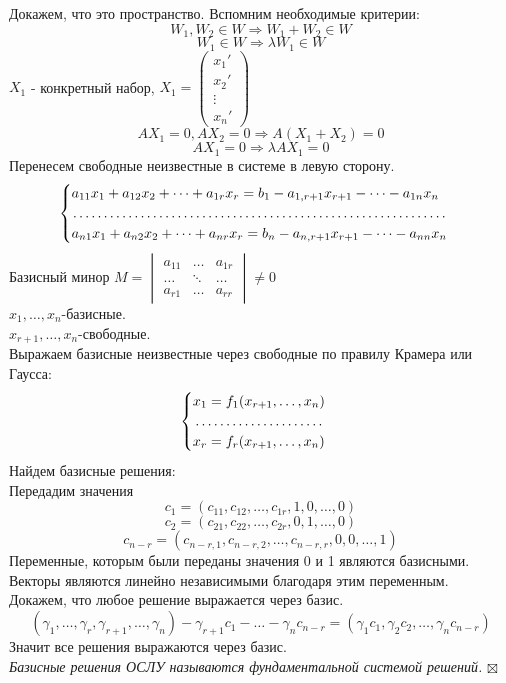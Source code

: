 \documentclass[a4paper, 12pt]{report}
\newenvironment{Proof}
{\par\noindent{$\blacklozenge$}}
{\hfill$\scriptstyle\boxtimes$}
\begin{document}
\begin{Proof}
   Докажем, что это пространство. Вспомним необходимые критерии:
   $$W_1, W_2  \in W \Rightarrow W_1+W_2 \in W$$
   $$W_1 \in W \Rightarrow \lambda W_1 \in W$$
   $X_1$ - конкретный набор, $X_1=
\begin{pmatrix}
x_1\prime\\
x_2\prime\\
\vdots\\
x_n\prime
\end{pmatrix}$\\
$$AX_1=0, AX_2=0 \Rightarrow A(X_1+X_2)=0$$
$$AX_1=0 \Rightarrow \lambda AX_1=0$$
Перенесем свободные неизвестные в системе в левую сторону.
\begin{equation}
    \begin{cases}
    $$a_{11}x_1+a_{12}x_2+ \dots + a_{1r}x_r = b_1-a_{1, r+1}x_{r+1}- \dots -a_{1n}x_n$$\\
    $$\dotfill$$\\
    $$a_{n1}x_1+a_{n2}x_2+ \dots + a_{nr}x_r = b_n-a_{n, r+1}x_{r+1}- \dots -a_{nn}x_n$$
    \end{cases}
\end{equation}
Базисный минор $M=
\begin{vmatrix}
a_{11} & \dots & a_{1r}\\
\dots & \ddots & \dots\\
a_{r1} & \dots & a_{rr}
\end{vmatrix} \neq 0$\\
$x_1,\dots,x_n$-базисные.\\
$x_{r+1},\dots,x_n$-свободные.\\
Выражаем базисные неизвестные через свободные по правилу Крамера или Гаусса:
\begin{equation*}
    \begin{cases}
    $$x_1=f_1(x_{r+1},\dots,x_n)$$\\
    \dotfill\\
    $$x_r=f_r(x_{r+1},\dots,x_n)$$
    \end{cases}
\end{equation*}
Найдем базисные решения:\\
Передадим значения 
$$c_1=(c_{11},c_{12},\dots,c_{1r},1,0,\dots,0)$$
$$c_2=(c_{21},c_{22},\dots,c_{2r},0,1,\dots,0)$$
$$c_{n-r}=(c_{n-r,1},c_{n-r,2},\dots,c_{n-r,r},0,0,\dots,1)$$
Переменные, которым были переданы значения 0 и 1 являются базисными. Векторы являются линейно независимыми благодаря этим переменным.\\
Докажем, что любое решение выражается через базис.\\
$$(\gamma_1,\dots,\gamma_r,\gamma_{r+1},\dots,\gamma_n)-\gamma_{r+1}c_1-\dots-\gamma_nc_{n-r}=(\gamma_1c_1,\gamma_2c_2,\dots,\gamma_nc_{n-r})$$
Значит все решения выражаются через базис.\\
\textit{Базисные решения ОСЛУ называются фундаментальной системой решений.}
\end{Proof}
\end{document}
